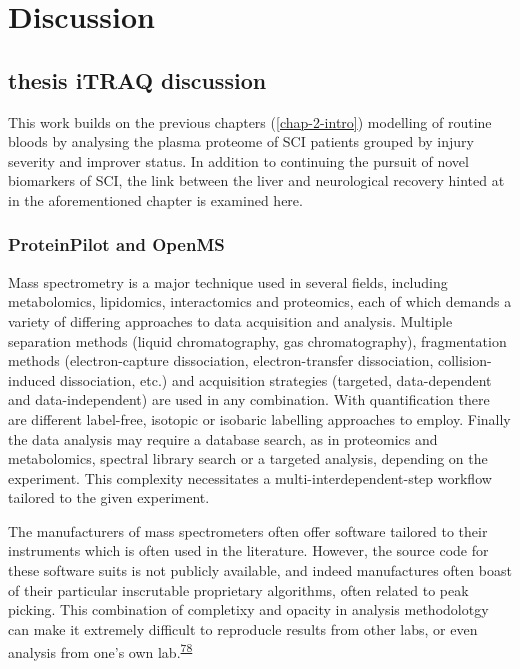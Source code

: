 \documentclass[
]{article}
\begin{document}
\hypertarget{discussion}{%
\section{Discussion}\label{discussion}}

\hypertarget{thesis-itraq-discussion}{%
\subsection{thesis iTRAQ discussion}\label{thesis-itraq-discussion}}

This work builds on the previous chapters (\ref{chap-2-intro}) modelling of routine bloods by analysing the plasma proteome of SCI patients grouped by injury severity and improver status.
In addition to continuing the pursuit of novel biomarkers of SCI, the link between the liver and neurological recovery hinted at in the aforementioned chapter is examined here.

\hypertarget{proteinpilot-and-openms}{%
\subsubsection{ProteinPilot and OpenMS}\label{proteinpilot-and-openms}}

Mass spectrometry is a major technique used in several fields, including metabolomics, lipidomics, interactomics and proteomics, each of which demands a variety of differing approaches to data acquisition and analysis.
Multiple separation methods (liquid chromatography, gas chromatography), fragmentation methods (electron-capture dissociation, electron-transfer dissociation, collision-induced dissociation, etc.) and acquisition strategies (targeted, data-dependent and data-independent) are used in any combination.
With quantification there are different label-free, isotopic or isobaric labelling approaches to employ.
Finally the data analysis may require a database search, as in proteomics and metabolomics, spectral library search or a targeted analysis, depending on the experiment.
This complexity necessitates a multi-interdependent-step workflow tailored to the given experiment.

The manufacturers of mass spectrometers often offer software tailored to their instruments which is often used in the literature.
However, the source code for these software suits is not publicly available, and indeed manufactures often boast of their particular inscrutable proprietary algorithms, often related to peak picking.
This combination of completixy and opacity in analysis methodolotgy can make it extremely difficult to reproducle results from other labs, or even analysis from one's own lab.\textsuperscript{\protect\hyperlink{ref-noauthor_devil_2011}{78}}
\end{document}
